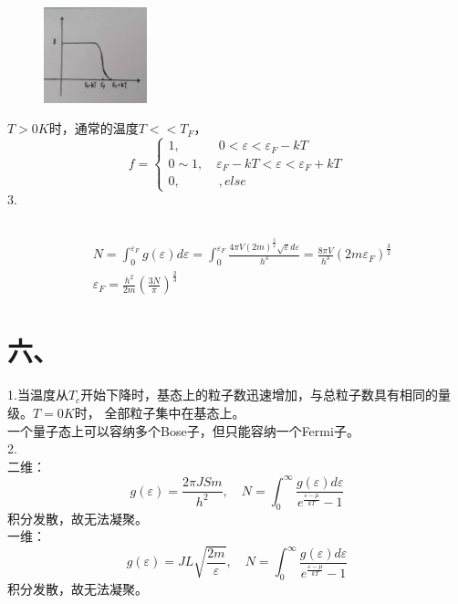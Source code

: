 \documentclass[UTF8]{ctexart}
\begin{document}
\subsection*{}
\begin{figure}
  \includegraphics[width=3cm]{4_2.jpg}
\end{figure}
$T>0K$时，通常的温度$T<<T_F$，
\begin{equation*}
  f=\begin{cases}
    1,\quad\quad\quad 0<\varepsilon<\varepsilon_F-kT            \\
    0\sim1, \quad \varepsilon_F-kT<\varepsilon<\varepsilon_F+kT \\
    0,\quad\quad\quad,else
  \end{cases}
\end{equation*}
3.
\subsection*{}
\begin{equation*}
  \begin{aligned}
     & N=\int_0^{\varepsilon_F}g(\varepsilon)d\varepsilon
    =\int_0^{\varepsilon_F}\frac{4\pi V(2m)^\frac{3}{2}\sqrt\varepsilon d\varepsilon}{h^3}
    =\frac{8\pi V}{h^3}(2m\varepsilon_F)^\frac{3}{2}            \\
     & \varepsilon_F=\frac{h^2}{2m}(\frac{3N}{\pi})^\frac{2}{3}
  \end{aligned}
\end{equation*}
\section*{六、}
1.当温度从$T_c$开始下降时，基态上的粒子数迅速增加，与总粒子数具有相同的量级。$T=0K$时，
全部粒子集中在基态上。\\
一个量子态上可以容纳多个Bose子，但只能容纳一个Fermi子。\\
2.\\
二维：
\begin{equation*}
  g(\varepsilon)=\frac{2\pi JSm}{h^2},\quad
  N=\int_0^\infty\frac{g(\varepsilon)d\varepsilon}{e^\frac{\varepsilon-\mu}{kT}-1}
\end{equation*}
积分发散，故无法凝聚。\\
一维：
\begin{equation*}
  g(\varepsilon)=JL\sqrt{\frac{2m}{\varepsilon}},\quad
  N=\int_0^\infty\frac{g(\varepsilon)d\varepsilon}{e^\frac{\varepsilon-\mu}{kT}-1}
\end{equation*}
积分发散，故无法凝聚。
\end{document}

